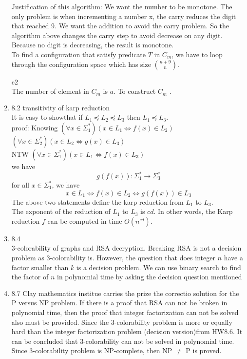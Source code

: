 \documentclass[11pt]{article}
\begin{document}
\begin{enumerate}
\begin{tabbing}
\end{tabbing}

Justification of this algorithm:
We want the number to be monotone. The only problem is when incrementing a number x, the carry reduces the digit that reached 9. We want the addition to avoid the carry problem. So the algorithm above changes the carry step to avoid decrease on any digit. Because no digit is decreasing, the result is monotone.\\

To find a configuration that satisfy predicate $T$ in $C_m$, we have to loop through the configuration space which has size ${n+9 \choose n}$.

c2\\
The number of element in $C_m$ is $a$. To construct $C_m$ .


\item 8.2 transitivity of karp reduction\\
It is easy to showthat if $L_1 \preccurlyeq L_2 \preccurlyeq L_3$ then $L_1 \preccurlyeq L_3$.\\ 
proof:
Knowing
$(\forall x \in \Sigma_1^*)(x \in L_1 \iff f(x) \in L_2)$\\
$(\forall x \in \Sigma_2^*)(x \in L_2 \iff g(x) \in L_3)$\\

NTW
$(\forall x \in \Sigma_1^*)(x \in L_1 \iff f(x) \in L_3)$\\

we have 
\[ g(f(x)): \Sigma_1^* \to \Sigma_3^* \]
for all $x \in \Sigma_1^*$, we have
\[ x \in L_1 \iff f(x) \in L_2 \iff g(f(x)) \in L_3\]
The above two statements define the karp reduction from $L_1$ to $L_3$.\\

The exponent of the reduction of $L_1$ to $L_3$ is $cd$. In other words, the Karp reduction $f$ can be computed in time $O(n^{cd})$.


\item 8.4\\
3-colorability of graphs and RSA decryption.
Breaking RSA is not a decision problem as 3-colorability is. However, the question that does integer $n$ have a factor smaller than $k$ is a decision problem. We can use binary search to find the factor of $n$ in polynomial time by asking the decision question mentioned

\item 8.7
Clay mathematics institue carries the prize the correctio solution for the P versus NP problem. If there is a proof that RSA can not be broken in polynomial time, then the proof that integer factorization can not be solved also must be provided. Since the 3-colorability problem is more or equally hard than the integer factorization problem (decision version)from HW8.6. It can be concluded that 3-colorability can not be solved in polynomial time. Since 3-colorability problem is NP-complete, then NP $\neq$ P is proved. 


\end{enumerate}
\end{document}
